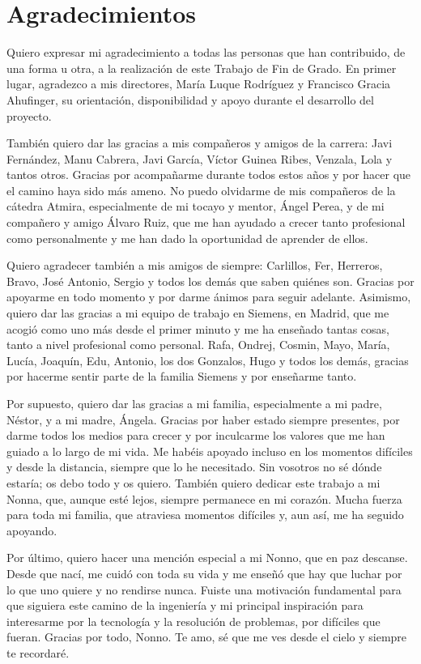 \chapter*{Agradecimientos}

Quiero expresar mi agradecimiento a todas las personas que han contribuido, de una forma u otra, a la realización de este Trabajo de Fin de Grado. En primer lugar, agradezco a mis directores, María Luque Rodríguez y Francisco Gracia Ahufinger, su orientación, disponibilidad y apoyo durante el desarrollo del proyecto.

También quiero dar las gracias a mis compañeros y amigos de la carrera: Javi Fernández, Manu Cabrera, Javi García, Víctor Guinea Ribes, Venzala, Lola y tantos otros. Gracias por acompañarme durante todos estos años y por hacer que el camino haya sido más ameno. No puedo olvidarme de mis compañeros de la cátedra Atmira, especialmente de mi tocayo y mentor, Ángel Perea, y de mi compañero y amigo Álvaro Ruiz, que me han ayudado a crecer tanto profesional como personalmente y me han dado la oportunidad de aprender de ellos.

Quiero agradecer también a mis amigos de siempre: Carlillos, Fer, Herreros, Bravo, José Antonio, Sergio y todos los demás que saben quiénes son. Gracias por apoyarme en todo momento y por darme ánimos para seguir adelante. Asimismo, quiero dar las gracias a mi equipo de trabajo en Siemens, en Madrid, que me acogió como uno más desde el primer minuto y me ha enseñado tantas cosas, tanto a nivel profesional como personal. Rafa, Ondrej, Cosmin, Mayo, María, Lucía, Joaquín, Edu, Antonio, los dos Gonzalos, Hugo y todos los demás, gracias por hacerme sentir parte de la familia Siemens y por enseñarme tanto.

Por supuesto, quiero dar las gracias a mi familia, especialmente a mi padre, Néstor, y a mi madre, Ángela. Gracias por haber estado siempre presentes, por darme todos los medios para crecer y por inculcarme los valores que me han guiado a lo largo de mi vida. Me habéis apoyado incluso en los momentos difíciles y desde la distancia, siempre que lo he necesitado. Sin vosotros no sé dónde estaría; os debo todo y os quiero. También quiero dedicar este trabajo a mi Nonna, que, aunque esté lejos, siempre permanece en mi corazón. Mucha fuerza para toda mi familia, que atraviesa momentos difíciles y, aun así, me ha seguido apoyando.

Por último, quiero hacer una mención especial a mi Nonno, que en paz descanse. Desde que nací, me cuidó con toda su vida y me enseñó que hay que luchar por lo que uno quiere y no rendirse nunca. Fuiste una motivación fundamental para que siguiera este camino de la ingeniería y mi principal inspiración para interesarme por la tecnología y la resolución de problemas, por difíciles que fueran. Gracias por todo, Nonno. Te amo, sé que me ves desde el cielo y siempre te recordaré.